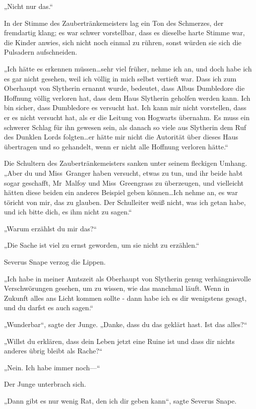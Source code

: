 {„Nicht nur das.“

In der Stimme des Zaubertränkemeisters lag ein Ton des Schmerzes, der fremdartig klang; es war schwer vorstellbar, dass es dieselbe harte Stimme war, die Kinder anwies, sich nicht noch einmal zu rühren, sonst würden sie sich die Pulsadern aufschneiden.

„Ich hätte es erkennen müssen…sehr viel früher, nehme ich an, und doch habe ich es gar nicht gesehen, weil ich völlig in mich selbst vertieft war. Dass ich zum Oberhaupt von Slytherin ernannt wurde, bedeutet, dass Albus Dumbledore die Hoffnung völlig verloren hat, dass dem Haus Slytherin geholfen werden kann. Ich bin sicher, dass Dumbledore es versucht hat. Ich kann mir nicht vorstellen, dass er es nicht versucht hat, als er die Leitung von Hogwarts übernahm. Es muss ein schwerer Schlag für ihn gewesen sein, als danach so viele aus Slytherin dem Ruf des Dunklen Lords folgten…er hätte mir nicht die Autorität über dieses Haus übertragen und so gehandelt, wenn er nicht alle Hoffnung verloren hätte.“

Die Schultern des Zaubertränkemeisters sanken unter seinem fleckigen Umhang. „Aber du und Miss~Granger haben versucht, etwas zu tun, und ihr beide habt sogar geschafft, Mr~Malfoy und Miss~Greengrass zu überzeugen, und vielleicht hätten diese beiden ein anderes Beispiel geben können…Ich nehme an, es war töricht von mir, das zu glauben. Der Schulleiter weiß nicht, was ich getan habe, und ich bitte dich, es ihm nicht zu sagen.“

„Warum erzählst du mir das?“

„Die Sache ist viel zu ernst geworden, um sie nicht zu erzählen.“

Severus Snape verzog die Lippen.

„Ich habe in meiner Amtszeit als Oberhaupt von Slytherin genug verhängnisvolle Verschwörungen gesehen, um zu wissen, wie das manchmal läuft. Wenn in Zukunft alles ans Licht kommen sollte - dann habe ich es dir wenigstens gesagt, und du darfst es auch sagen.“

„Wunderbar“, sagte der Junge. „Danke, dass du das geklärt hast. Ist das alles?“

„Willst du erklären, dass dein Leben jetzt eine Ruine ist und dass dir nichts anderes übrig bleibt als Rache?“

„Nein. Ich habe immer noch—“

Der Junge unterbrach sich.

„Dann gibt es nur wenig Rat, den ich dir geben kann“, sagte Severus Snape.

}
